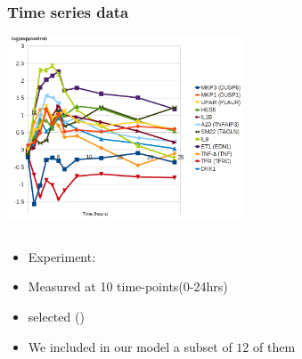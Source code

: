 \begin{frame}[c]
  \frametitle{Time series data}
  
\begin{center}
  \includegraphics[width=70mm]{figs/12genes.png}
\end{center}


\begin{columns}
\begin{column}{0.7\textwidth}
\begin{itemize}
  \item Experiment: 
  \item Measured at 10 time-points(0-24hrs)
  \item {} selected  () %
  \item We included in our model a subset of $12$ of them
\end{itemize}
\end{column}

\begin{column}{0.3\textwidth}

\end{column}
\end{columns}

\end{frame}

